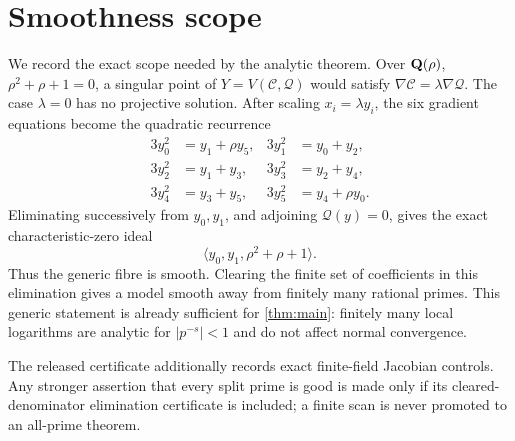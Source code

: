 \section{Smoothness scope}\label{sec:smoothness}

We record the exact scope needed by the analytic theorem.  Over
\(\mathbf Q(\rho)\), \(\rho^2+\rho+1=0\), a singular point of
\(Y=V(\mathcal C,\mathcal Q)\) would satisfy
\(\nabla\mathcal C=\lambda\nabla\mathcal Q\).  The case \(\lambda=0\)
has no projective solution.  After scaling \(x_i=\lambda y_i\), the six
gradient equations become the quadratic recurrence
\begin{align*}
3y_0^2&=y_1+\rho y_5,&
3y_1^2&=y_0+y_2,\\
3y_2^2&=y_1+y_3,&
3y_3^2&=y_2+y_4,\\
3y_4^2&=y_3+y_5,&
3y_5^2&=y_4+\rho y_0.
\end{align*}
Eliminating successively from \(y_0,y_1\), and adjoining
\(\mathcal Q(y)=0\), gives the exact characteristic-zero ideal
\[
 \langle y_0,y_1,\rho^2+\rho+1\rangle.
\]
Thus the generic fibre is smooth.  Clearing the finite set of coefficients
in this elimination gives a model smooth away from finitely many rational
primes.  This generic statement is already sufficient for
\cref{thm:main}: finitely many local logarithms are analytic for
\(|p^{-s}|<1\) and do not affect normal convergence.

The released certificate additionally records exact finite-field Jacobian
controls.  Any stronger assertion that every split prime is good is made
only if its cleared-denominator elimination certificate is included; a
finite scan is never promoted to an all-prime theorem.
